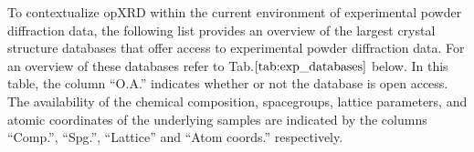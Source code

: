 To contextualize opXRD within the current environment of experimental powder diffraction data, the following list provides an overview of the largest crystal structure databases that offer access to experimental powder diffraction data. For an overview of these databases refer to Tab.$\eqref{tab:exp_databases}$ below. In this table, the column ``O.A.'' indicates whether or not the database is open access. The availability of the chemical composition, spacegroups, lattice parameters, and atomic coordinates of the underlying samples are indicated by the columns ``Comp.'', ``Spg.'', ``Lattice'' and ``Atom coords.'' respectively.

\begin{table}[!htb]
\centering
\caption{Overview of experimental powder diffraction databases}
\label{tab:exp_databases}
\end{table}

